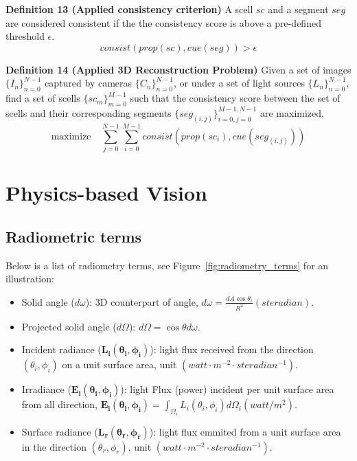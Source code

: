 \noindent\textbf{Definition 13 (Applied consistency criterion)} A scell $sc$ and a segment $seg$ are considered consistent if the the consistency score is above a pre-defined threshold $\epsilon$.
$$
consist(prop(sc), cue(seg)) > \epsilon
$$


\noindent\textbf{Definition 14 (Applied 3D Reconstruction Problem)} Given a set of images $\{I_n\}_{n=0}^{N-1}$ captured by cameras $\{C_n\}_{n=0}^{N-1}$, or under a set of light sources $\{L_n\}_{n=0}^{N-1}$, find a set of scells $\{sc_m\}_{m=0}^{M-1}$ such that the consistency score between the set of scells and their corresponding segments $\{seg_{(i, j)}\}_{i=0,j=0}^{M-1,N-1}$ are maximized.
$$
\mbox{maximize} \quad \sum_{j=0}^{N-1}\sum_{i=0}^{M-1} consist(prop(sc_i), cue(seg_{(i, j)}))
$$

\section{Physics-based Vision}
\label{sec:pbv}

\subsection{Radiometric terms}
\label{sec:radio_term}
Below is a list of radiometry terms, see Figure~\ref{fig:radiometry_terms} for an illustration:
\begin{itemize}
\item Solid angle ($d\omega$): 3D counterpart of angle, $d\omega=\frac{dA \cos\theta_i}{R^2}\mathit{ (steradian)}$.
\item Projected solid angle ($d\Omega$): $d\Omega = \cos\theta d\omega$.
\item Incident radiance ($\mathbf{L_i(\theta_i, \phi_i)}$): light flux received from the direction $(\theta_i, \phi_i)$ on a unit surface area, unit $\mathit{ (watt\cdot m^{-2}\cdot steradian^{-1})}$.
\item Irradiance ($\mathbf{E_i(\theta_i, \phi_i)}$): light Flux (power) incident per unit surface area from all direction, $\mathbf{E_i(\theta_i, \phi_i)}=\int_{\Omega_i} L_i(\theta_i, \phi_i) d\Omega_i \mathit{ (watt/m^2)}$.
\item Surface radiance ($\mathbf{L_r(\theta_r, \phi_r)}$): light flux emmited from a unit surface area in the direction $(\theta_r, \phi_r)$, unit $\mathit{ (watt\cdot m^{-2}\cdot steradian^{-1})}$.
\end{itemize}

